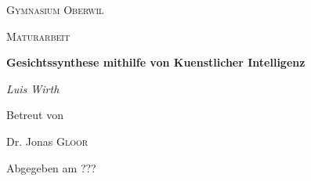 \documentclass[../main]{subfiles}
\begin{document}
\begin{titlepage}
    \centering
    
    {\scshape\LARGE Gymnasium Oberwil\par}
    \vspace{1cm}
    {\scshape\Large Maturarbeit\par}
    \vspace{1.5cm}
    {\huge\bfseries Gesichtssynthese mithilfe von Kuenstlicher Intelligenz\par}
    \vspace{2cm}
    {\Large\itshape Luis Wirth\par}
    \vfill
    Betreut von\par
    Dr. Jonas \textsc{Gloor}
    
    \vfill
    {\large Abgegeben am ???\par}
\end{titlepage}
\end{document}
